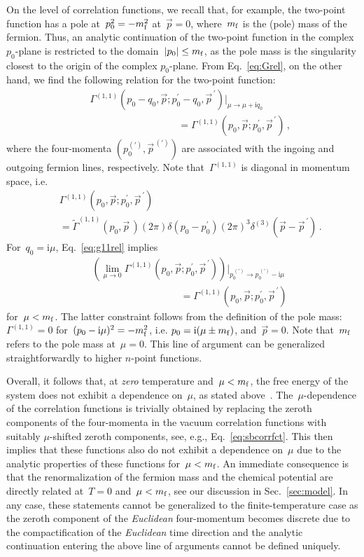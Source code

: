 \documentclass[prd,english,preprintnumbers,amsmath,amssymb,nofootinbib,twocolumn,superscriptaddress]{revtex4-1}
\newcommand{\I}{\mathrm{i}}
\newcommand{\be}{\begin{eqnarray}}
\newcommand{\ee}{\end{eqnarray}}
\newcommand{\nn}{\nonumber }
\begin{document}
{{On the level of correlation functions, we recall that, for example, the two-point function has a pole at~$p_0^2=-m_{\rm f}^2$ at~$\vec{p}=0$, 
where~$m_{\rm f}$ is the (pole) mass
of the fermion. Thus, an analytic continuation of the two-point function in the complex $p_0$-plane 
is restricted to the domain~$|p_0|\leq m_{\rm f}$, as the pole mass is the singularity closest to the origin of the 
complex $p_0$-plane. From Eq.~\eqref{eq:Grel}, on the other hand, we find the following relation for
the two-point function:
%
\be
&&\Gamma^{(1,1)}(p_0-q_0,\vec{p};p_0^{\prime}-q_0,\vec{p}^{\,\prime})\big|_{\mu \to \mu+\I q_0}\nn\\
&& \qquad\qquad\qquad\qquad\quad = \Gamma^{(1,1)}(p_0,\vec{p};p_0^{\prime},\vec{p}^{\,\prime})\,,
\label{eq:g11rel}
\ee
%
where the four-momenta $(p_0^{(\prime)},\vec{p}^{\,(\prime)})$ are associated {with the ingoing and outgoing 
fermion lines, respectively.} Note that~$\Gamma^{(1,1)}$ is diagonal in 
momentum space, i.e.
%
\be
 &&\!\!\!\!\!\!\!\!\!\! \Gamma^{(1,1)}(p_0,\vec{p};p_0^{\prime},\vec{p}^{\,\prime})\nn\\
&&=\tilde{\Gamma}^{(1,1)}(p_0,\vec{p}^{\,})
(2\pi)\delta(p_0\!-\! p_0^{\prime})(2\pi)^3\delta^{(3)}(\vec{p}\!-\!\vec{p}^{\,\prime})\,.
\ee
%
For~$q_0=\I\mu$, Eq.~\eqref{eq:g11rel} implies
%
\be
&&\left(\lim_{\mu\to 0}\Gamma^{(1,1)}(p_0,\vec{p};p_0^{\prime},\vec{p}^{\,\prime})\right)\bigg|_{p_0^{\,(\prime)}\to p_0^{\,(\prime)}-\I\mu} \nn\\
&& \qquad\qquad\qquad\qquad\quad = \Gamma^{(1,1)}(p_0,\vec{p};p_0^{\prime},\vec{p}^{\,\prime})\,
\label{eq:sbcorrfct}
\ee
%
for~$\mu < m_{\rm f}$. The latter constraint follows from the 
definition of the pole mass:~$\Gamma^{(1,1)}=0$ for~$(p_0-\I\mu)^2 = -m_{\rm f}^2$, i.e. $p_0=\I(\mu\pm m_{\rm f})$, and~$\vec{p}=0$. 
Note that~$m_{\rm f}$ refers to the pole mass at~$\mu=0$. 
This line of argument can be generalized straightforwardly to higher $n$-point
functions. 

Overall, it follows that, at {\it zero} temperature and~$\mu < m_{\rm f}$, 
the free energy of the system does not exhibit a dependence on~$\mu$, 
as stated above~\cite{Cohen:2003kd}.
The~$\mu$-dependence of the correlation functions is trivially obtained by replacing the 
zeroth components of the four-momenta in the vacuum correlation functions
with suitably $\mu$-shifted zeroth components, see, e.g., Eq.~\eqref{eq:sbcorrfct}.
{This then implies} that these functions also do 
not exhibit a dependence on~$\mu$ due to the analytic properties of these functions for~$\mu < m_{\rm f}$.
An immediate consequence is that the renormalization of the fermion mass and the chemical potential are
directly related at~$T=0$ and~$\mu < m_{\rm f}$, see our discussion in Sec.~\ref{sec:model}.
In any case, these statements cannot be generalized to the finite-temperature case as the zeroth
component of the {\it Euclidean} four-momentum becomes discrete due to the compactification of the
{\it Euclidean} time direction and the analytic continuation entering the above line of arguments cannot be defined uniquely.

}}
\end{document}
